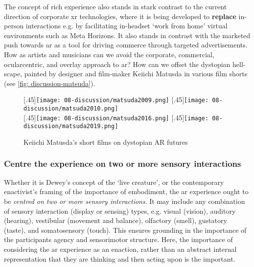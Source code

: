 The concept of rich experience also stands in stark contrast to the current direction of corporate \gls{xr} technologies, where it is being developed to \textbf{replace} in-person interactions e.g. by facilitating in-headset `work from home' virtual environments such as Meta Horizons. It also stands in contrast with the marketed push towards \gls{ar} as a tool for driving commerce through targeted advertisements. How as artists and musicians can we avoid the corporate, commercial, ocularcentric, and overlay approach to \gls{ar}? How can we offset the dystopian hell-scape, painted by designer and film-maker Keiichi Matusda in various film shorts (see \autoref{fig: discussion-matsuda}).

\begin{figure}[hbt]
    \centering
    \captionsetup{justification=centering}
    [.45\linewidth]{\texttt{[image: 08-discussion/matsuda2009.png]}}
    \hfill
    [.45\linewidth]{\texttt{[image: 08-discussion/matsuda2010.png]}} \\
    \vspace{0.5cm}
    [.45\linewidth]{\texttt{[image: 08-discussion/matsuda2016.png]}}
    \hfill
    [.45\linewidth]{\texttt{[image: 08-discussion/matsuda2019.png]}}
    \caption{Keiichi Matusda's short films on dystopian AR futures}
    \label{fig: discussion-matsuda}
\end{figure}

\subsubsection{Centre the experience on two or more sensory interactions}
Whether it is Dewey's concept of the `live creature', or the contemporary enactivist's framing of the importance of embodiment, the \gls{ar} experience ought to be \textit{centred on two or more sensory interactions}. It may include any combination of sensory interaction (display or sensing) types, e.g. visual (vision), auditory (hearing), vestibular (movement and balance), olfactory (smell), gustatory (taste), and somatosensory (touch). This ensures grounding in the importance of the participants agency and sensorimotor structure. Here, the importance of considering the \gls{ar} experience as an enaction, rather than an abstract internal representation that they are thinking and then acting upon is the important.

